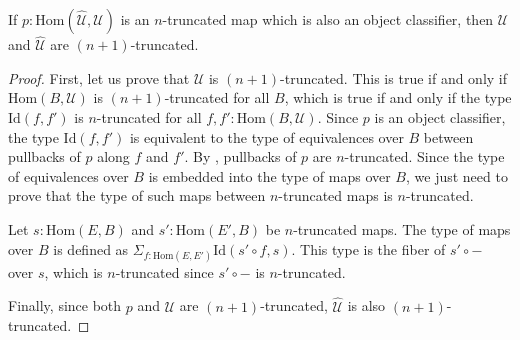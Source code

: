 \documentclass[reqno]{mscs}
\newcommand{\fs}[1]{\mathrm{#1}}
\newcommand{\Hom}{\fs{Hom}}
\newcommand{\Id}{\fs{Id}}
\numberwithin{figure}{section}
\begin{document}
\begin{prop}
If $p : \Hom(\widehat{\mathcal{U}},\mathcal{U})$ is an $n$-truncated map which is also an object classifier, then $\mathcal{U}$ and $\widehat{\mathcal{U}}$ are $(n+1)$-truncated.
\end{prop}
\begin{proof}
First, let us prove that $\mathcal{U}$ is $(n+1)$-truncated.
This is true if and only if $\Hom(B,\mathcal{U})$ is $(n+1)$-truncated for all $B$, which is true if and only if the type $\Id(f,f')$ is $n$-truncated for all $f,f' : \Hom(B,\mathcal{U})$.
Since $p$ is an object classifier, the type $\Id(f,f')$ is equivalent to the type of equivalences over $B$ between pullbacks of $p$ along $f$ and $f'$.
By , pullbacks of $p$ are $n$-truncated.
Since the type of equivalences over $B$ is embedded into the type of maps over $B$, we just need to prove that the type of such maps between $n$-truncated maps is $n$-truncated.

Let $s : \Hom(E,B)$ and $s' : \Hom(E',B)$ be $n$-truncated maps.
The type of maps over $B$ is defined as $\Sigma_{f : \Hom(E,E')} \Id(s' \circ f, s)$.
This type is the fiber of $s' \circ -$ over $s$, which is $n$-truncated since $s' \circ -$ is $n$-truncated.

Finally, since both $p$ and $\mathcal{U}$ are $(n+1)$-truncated, $\widehat{\mathcal{U}}$ is also $(n+1)$-truncated.
\end{proof}
\end{document}
